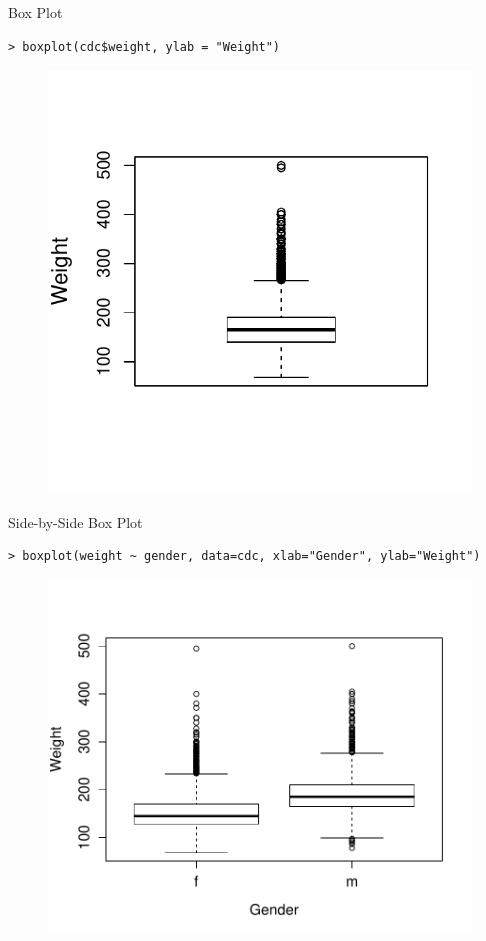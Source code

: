 \documentclass[10pt]{beamer}
\begin{document}
\begin{frame}[fragile]{Box Plot}
\begin{verbatim}
> boxplot(cdc$weight, ylab = "Weight")
\end{verbatim}
\begin{figure}[htbp]
\centering
\includegraphics[scale=0.6]{figure/boxplot_wt.pdf}
\end{figure}
\end{frame}

\begin{frame}[fragile]{Side-by-Side Box Plot}
\small
\begin{verbatim}
> boxplot(weight ~ gender, data=cdc, xlab="Gender", ylab="Weight")
\end{verbatim}
\begin{figure}[htbp]
\centering
\includegraphics[scale=0.5]{figure/boxplot_wt_mf.pdf}
\end{figure}
\end{frame}
\end{document}
